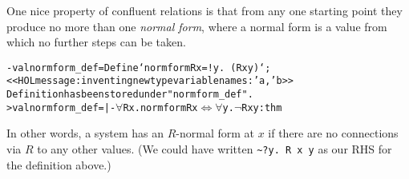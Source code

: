 One nice property of confluent relations is that from any one starting
point they produce no more than one \emph{normal form}, where a normal
form is a value from which no further steps can be taken.
\begin{session}
\begin{alltt}
- val normform_def = Define`normform R x = !y. ~(R x y)`;
<<HOL message: inventing new type variable names: 'a, 'b>>
Definition has been stored under "normform_def".
> val normform_def = |- \(\forall\)R x. normform R x \(\Leftrightarrow\) \(\forall\)y. \(\neg\)R x y : thm
\end{alltt}
\end{session}
In other words, a system has an $R$-normal form at $x$ if there are no
connections via $R$ to any other values.  (We could have written
\verb!~?y. R x y! as our RHS for the definition above.)

